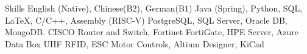 
\begin{rubric}{Skills}
\entry*[Languages]
    English (Native), Chinese(B$2$), German(B$1$)
    Java (Spring), Python, SQL, \LaTeX, C/C++, Assembly (RISC-V)
\entry*[Databases]
    PostgreSQL, SQL Server, Oracle DB, MongoDB.
\entry*[Networking]
    CISCO Router and Switch, Fortinet FortiGate, HPE Server, Azure Data Box
\entry*[Misc.]
    UHF RFID, ESC Motor Controls, Altium Designer, KiCad
\end{rubric}
